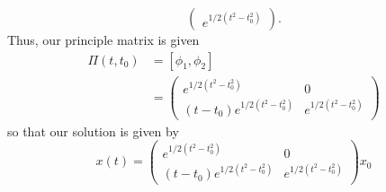 \documentclass{article}
\begin{document}
\begin{itemize}
\[\begin{pmatrix}
    e^{1/2(t^2 - t_0^2)}
\end{pmatrix}.\]
Thus, our principle matrix is given
\begin{align*}
    \Pi(t,t_0) &= [\phi_1, \phi_2]\\
    &= \begin{pmatrix*}
        e^{1/2(t^2 - t_0^2)} & 0\\
        (t - t_0)e^{1/2(t^2 - t_0^2)} & e^{1/2(t^2 - t_0^2)}
    \end{pmatrix*}
\end{align*}
so that our solution is given by
\[x(t) = \begin{pmatrix}
        e^{1/2(t^2 - t_0^2)} & 0\\
        (t - t_0)e^{1/2(t^2 - t_0^2)} & e^{1/2(t^2 - t_0^2)}
\end{pmatrix}x_0\]


\end{itemize}
\end{document}
